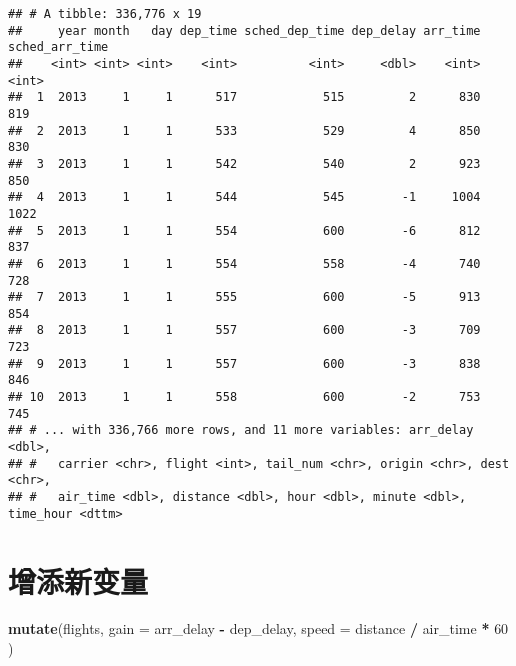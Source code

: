 \documentclass[
]{article}
\newenvironment{Shaded}{\begin{snugshade}}{\end{snugshade}}
\newcommand{\DataTypeTok}[1]{\textcolor[rgb]{0.13,0.29,0.53}{#1}}
\newcommand{\DecValTok}[1]{\textcolor[rgb]{0.00,0.00,0.81}{#1}}
\newcommand{\KeywordTok}[1]{\textcolor[rgb]{0.13,0.29,0.53}{\textbf{#1}}}
\newcommand{\NormalTok}[1]{#1}
\newcommand{\OperatorTok}[1]{\textcolor[rgb]{0.81,0.36,0.00}{\textbf{#1}}}
\newcommand{\StringTok}[1]{\textcolor[rgb]{0.31,0.60,0.02}{#1}}
\begin{document}
\begin{verbatim}
## # A tibble: 336,776 x 19
##     year month   day dep_time sched_dep_time dep_delay arr_time sched_arr_time
##    <int> <int> <int>    <int>          <int>     <dbl>    <int>          <int>
##  1  2013     1     1      517            515         2      830            819
##  2  2013     1     1      533            529         4      850            830
##  3  2013     1     1      542            540         2      923            850
##  4  2013     1     1      544            545        -1     1004           1022
##  5  2013     1     1      554            600        -6      812            837
##  6  2013     1     1      554            558        -4      740            728
##  7  2013     1     1      555            600        -5      913            854
##  8  2013     1     1      557            600        -3      709            723
##  9  2013     1     1      557            600        -3      838            846
## 10  2013     1     1      558            600        -2      753            745
## # ... with 336,766 more rows, and 11 more variables: arr_delay <dbl>,
## #   carrier <chr>, flight <int>, tail_num <chr>, origin <chr>, dest <chr>,
## #   air_time <dbl>, distance <dbl>, hour <dbl>, minute <dbl>, time_hour <dttm>
\end{verbatim}

\hypertarget{ux589eux6dfbux65b0ux53d8ux91cf}{%
\section{增添新变量}\label{ux589eux6dfbux65b0ux53d8ux91cf}}

\begin{Shaded}
\begin{Highlighting}[]
\KeywordTok{mutate}\NormalTok{(flights,}
  \DataTypeTok{gain =}\NormalTok{ arr_delay }\OperatorTok{-}\StringTok{ }\NormalTok{dep_delay,}
  \DataTypeTok{speed =}\NormalTok{ distance }\OperatorTok{/}\StringTok{ }\NormalTok{air_time }\OperatorTok{*}\StringTok{ }\DecValTok{60}
\NormalTok{)}
\end{Highlighting}
\end{Shaded}
\end{document}

